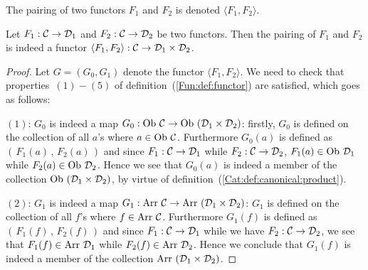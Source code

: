 \begin{notation}\label{Fun:notation:pairing}
    The pairing of two functors $F_{1}$ and $F_{2}$ is denoted
    $\langle F_{1}, F_{2}\rangle$.
\end{notation}
\begin{prop}\label{Fun:prop:pairing}
    Let $F_{1}:\mbox{$\cal C$}\to\mbox{${\cal D}_{1}$}$ and $F_{2}:\mbox{$\cal C$}\to\mbox{${\cal D}_{2}$}$ be two functors. Then 
    the pairing of $F_{1}$ and $F_{2}$ is indeed a functor 
    $\langle F_{1}, F_{2}\rangle : \mbox{$\cal C$}\to\mbox{${\cal D}_{1}$}\times\mbox{${\cal D}_{2}$}$.
\end{prop}
\begin{proof}
    Let $G=(G_{0},G_{1})$ denote the functor $\langle F_{1}, F_{2}\rangle$.
    We need to check that properties~$(1)-(5)$ of 
    definition~(\ref{Fun:def:functor}) are satisfied, which goes as follows:

    $(1)$: $G_{0}$ is indeed a map $G_{0}:\mbox{\rm Ob}\ \mbox{$\cal C$}\to\mbox{\rm Ob}\ (\mbox{${\cal D}_{1}$}
    \times\mbox{${\cal D}_{2}$})$: firstly, $G_{0}$ is defined on the 
    collection of all $a$'s where $a\in\mbox{\rm Ob}\ \mbox{$\cal C$}$. Furthermore 
    $G_{0}(a)$ is defined as $(\,F_{1}(a)\,,\,F_{2}(a)\,)$ and since 
    $F_{1}:\mbox{$\cal C$}\to\mbox{${\cal D}_{1}$}$ while $F_{2}:\mbox{$\cal C$}\to\mbox{${\cal D}_{2}$}$, $F_{1}(a)
    \in\mbox{\rm Ob}\ \mbox{${\cal D}_{1}$}$ while $F_{2}(a)\in\mbox{\rm Ob}\ \mbox{${\cal D}_{2}$}$. Hence we see that
    $G_{0}(a)$ is indeed a member of the collection $\ob\ (\Done\times\Dtwo)$,
    by virtue of definition~(\ref{Cat:def:canonical:product}).
    
    $(2)$: $G_{1}$ is indeed a map $G_{1}:\arr\ \Cat\to\arr\ (\Done
    \times\Dtwo)$: $G_{1}$ is defined on the 
    collection of all $f$'s where $f\in\mbox{\rm Arr}\ \mbox{$\cal C$}$. Furthermore
    $G_{1}(f)$ is defined as $(\,F_{1}(f)\,,\,F_{2}(f)\,)$ and since 
    $F_{1}:\mbox{$\cal C$}\to\mbox{${\cal D}_{1}$}$ while we have $F_{2}:\mbox{$\cal C$}\to\mbox{${\cal D}_{2}$}$, we see that
    $F_{1}(f)\in\mbox{\rm Arr}\ \mbox{${\cal D}_{1}$}$ while $F_{2}(f)\in\mbox{\rm Arr}\ \mbox{${\cal D}_{2}$}$. Hence we 
    conclude that $G_{1}(f)$ is indeed a member of the collection 
    $\arr\ (\Done\times\Dtwo)$.


\end{proof}
